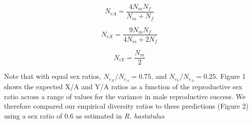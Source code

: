 \documentclass[9pt,twocolumn,twoside]{gsajnl}
\begin{document}
\begin{equation}
N_{e{A}} = \frac{4N_{m}N_{f}}{N_{m}+N_{f}} \label{eq:Ne}
\end{equation}

\begin{equation}
N_{e{X}} = \frac{9N_{m}N_{f}}{4N_{m}+2N_{f}} \label{eq:NeX}
\end{equation}

\begin{equation}
N_{e{Y}} = \frac{N_{m}}{2} \label{eq:NeY}
\end{equation}

Note that with equal sex ratios, $N_{e_{X}}/N_{e_{A}} = 0.75$, and $N_{e_{Y}}/N_{e_{A}} = 0.25$. Figure 1 shows the expected X/A and Y/A ratios as a function of the reproductive sex ratio across a range of values for the variance in male reproductive success. We therefore compared our empirical diversity ratios to these predictions (Figure 2) using a sex ratio of 0.6 as estimated in \textit{R. hastatulus}







\end{document}
